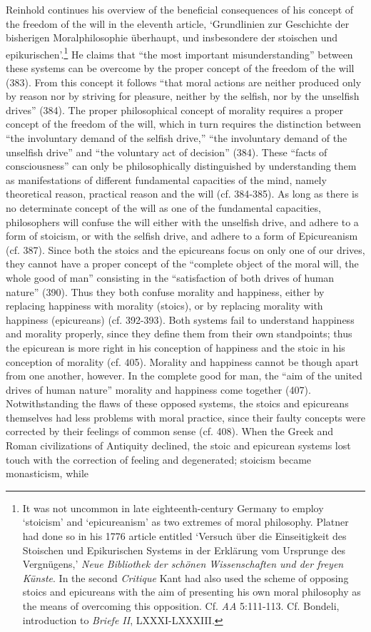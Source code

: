  Reinhold continues his overview of the beneficial consequences of his concept of the freedom of the will in the eleventh article, `Grundlinien zur Geschichte der bisherigen Moralphilosophie \"{u}berhaupt, und insbesondere der stoischen und epikurischen'.\footnote{ It was not uncommon in late eighteenth{-}century Germany to employ `stoicism' and `epicureanism' as two extremes of moral philosophy. Platner had done so in his 1776 article entitled `Versuch \"{u}ber die Einseitigkeit des Stoischen und Epikurischen Systems in der Erkl\"{a}rung vom Ursprunge des Vergn\"{u}gens,' \textit{Neue Bibliothek der sch\"{o}nen Wissenschaften und der freyen K\"{u}nste}. In the second \textit{Critique} Kant had also used the scheme of opposing stoics and epicureans with the aim of presenting his own moral philosophy as the means of overcoming this opposition. Cf. \textit{AA} 5:111{-}113. Cf. Bondeli, introduction to \textit{Briefe II}, LXXXI{-}LXXXIII.} He claims that ``the most important misunderstanding'' between these systems can be overcome by the proper concept of the freedom of the will (383). From this concept it follows ``that moral actions are neither produced only by reason nor by striving for pleasure, neither by the selfish, nor by the unselfish drives'' (384). The proper philosophical concept of morality requires a proper concept of the freedom of the will, which in turn requires the distinction between ``the involuntary demand of the selfish drive,'' ``the involuntary demand of the unselfish drive'' and ``the voluntary act of decision'' (384). These ``facts of consciousness'' can only be philosophically distinguished by understanding them as manifestations of different fundamental capacities of the mind, namely theoretical reason, practical reason and the will (cf. 384{-}385). As long as there is no determinate concept of the will as one of the fundamental capacities, philosophers will confuse the will either with the unselfish drive, and adhere to a form of stoicism, or with the selfish drive, and adhere to a form of Epicureanism (cf. 387). Since both the stoics and the epicureans focus on only one of our drives, they cannot have a proper concept of the ``complete object of the moral will, the whole good of man'' consisting in the ``satisfaction of both drives of human nature'' (390). Thus they both confuse morality and happiness, either by replacing happiness with morality (stoics), or by replacing morality with happiness (epicureans) (cf. 392{-}393). Both systems fail to understand happiness and morality properly, since they define them from their own standpoints; thus the epicurean is more right in his conception of happiness and the stoic in his conception of morality (cf. 405). Morality and happiness cannot be though apart from one another, however. In the complete good for man, the ``aim of the united drives of human nature'' morality and happiness come together (407). Notwithstanding the flaws of these opposed systems, the stoics and epicureans themselves had less problems with moral practice, since their faulty concepts were corrected by their feelings of common sense (cf. 408). When the Greek and Roman civilizations of Antiquity declined, the stoic and epicurean systems lost touch with the correction of feeling and degenerated; stoicism became monasticism, while 